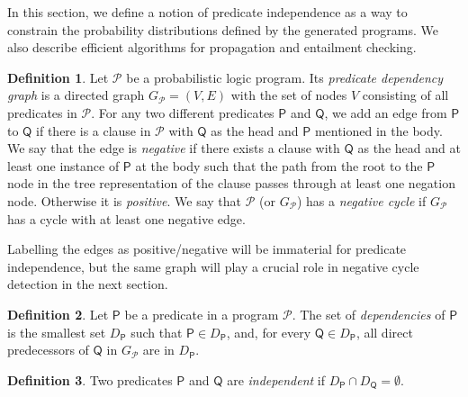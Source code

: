 \documentclass[letterpaper]{article}
\theoremstyle{definition}
\newtheorem{definition}{Definition}
\begin{document}
In this section, we define a notion of predicate independence as a way to
constrain the probability distributions defined by the generated programs. We
also describe efficient algorithms for propagation and entailment checking.

\begin{definition}
  Let $\mathscr{P}$ be a probabilistic logic program. Its \emph{predicate
    dependency graph} is a directed graph $G_{\mathscr{P}} = (V, E)$ with the
  set of nodes $V$ consisting of all predicates in $\mathscr{P}$. For any two
  different predicates $\mathsf{P}$ and $\mathsf{Q}$, we add an edge from
  $\mathsf{P}$ to $\mathsf{Q}$ if there is a clause in $\mathscr{P}$ with
  $\mathsf{Q}$ as the head and $\mathsf{P}$ mentioned in the body. We say that
  the edge is \emph{negative} if there exists a clause with $\mathsf{Q}$ as the
  head and at least one instance of $\mathsf{P}$ at the body such that the path
  from the root to the $\mathsf{P}$ node in the tree representation of the
  clause passes through at least one negation node. Otherwise it is
  \emph{positive}. We say that $\mathscr{P}$ (or $G_{\mathscr{P}}$) has a
  \emph{negative cycle} if $G_{\mathscr{P}}$ has a cycle with at least one
  negative edge.
\end{definition}

Labelling the edges as positive/negative will be immaterial for predicate
independence, but the same graph will play a crucial role in negative cycle
detection in the next section.

\begin{definition}
  Let $\mathsf{P}$ be a predicate in a program $\mathscr{P}$. The set of
  \emph{dependencies} of $\mathsf{P}$ is the smallest set $D_{\mathsf{P}}$ such
  that $\mathsf{P} \in D_{\mathsf{P}}$, and, for every $\mathsf{Q} \in
  D_{\mathsf{P}}$, all direct predecessors of $\mathsf{Q}$ in $G_{\mathscr{P}}$
  are in $D_{\mathsf{P}}$.
\end{definition}

\begin{definition}
  Two predicates $\mathsf{P}$ and $\mathsf{Q}$ are \emph{independent} if
  $D_{\mathsf{P}} \cap D_{\mathsf{Q}} = \emptyset$.
\end{definition}
\end{document}
